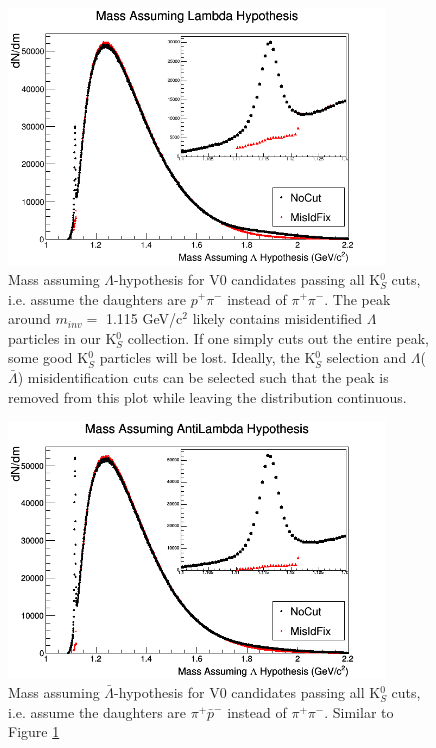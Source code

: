\begin{figure}[h]
  \centering
  \includegraphics[width=100mm]{3_DataSelection/Figures/MassAssumingLambdaHypothesis.png}
  \caption[$\Lambda$ contamination in K$^{0}_{S}$ collection]{Mass assuming $\Lambda$-hypothesis for V0 candidates passing all K$^{0}_{S}$ cuts, i.e. assume the daughters are $p^{+}\pi^{-}$ instead of $\pi^{+}\pi^{-}$.  The peak around $m_{inv} = $ 1.115 GeV/c$^{2}$ likely contains misidentified $\Lambda$ particles in our K$^{0}_{S}$ collection.  If one simply cuts out the entire peak, some good K$^{0}_{S}$ particles will be lost.  Ideally, the K$^{0}_{S}$ selection and $\Lambda$($\bar{\Lambda}$) misidentification cuts can be selected such that the peak is removed from this plot while leaving the distribution continuous.}
  \label{fig:MassAssLamHyp}
\end{figure}

\begin{figure}[h]
  \centering
  \includegraphics[width=100mm]{3_DataSelection/Figures/MassAssumingAntiLambdaHypothesis.png}
  \caption[$\bar{\Lambda}$ contamination in K$^{0}_{S}$ collection]{Mass assuming $\bar{\Lambda}$-hypothesis for V0 candidates passing all K$^{0}_{S}$ cuts, i.e. assume the daughters are $\pi^{+}\bar{p}^{-}$ instead of $\pi^{+}\pi^{-}$.  Similar to Figure \ref{fig:MassAssLamHyp}}
  \label{fig:MassAssALamHyp}
\end{figure}

